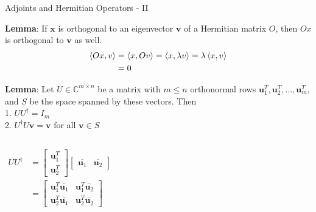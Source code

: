 \documentclass{beamer}
\begin{document}
\begin{frame}{Adjoints and Hermitian Operators - II\tiny{\cite{thespectraltheoremforhermitianmatrice}}}
  {\tiny
    \textbf{Lemma}: If $\mathbf{x}$ is orthogonal to an eigenvector $\mathbf{v}$ of a Hermitian matrix $O$, then $Ox$ is orthogonal to $\mathbf{v}$ as well. \\
    \begin{align*}
      \braket{Ox, v} &= \braket{x, Ov} = \braket{x, \lambda v} = \lambda \braket{x, v} \\
                     & = 0
    \end{align*}

    \vspace{0.3cm}
    \textbf{Lemma}: Let $U \in \mathbb{C}^{m \times n}$ be a matrix
    with $m \leq n$ orthonormal rows $\mathbf{u}_1^{T}, \mathbf{u}_2^{T}, \dots, \mathbf{u}_m^{T}$,
    and $S$ be the space spanned by these vectors. Then \\
    1. $UU^{\dagger} = I_m$ \\
    2. $U^{\dagger}U\mathbf{v} = \mathbf{v}$ for all $\mathbf{v} \in S$
    \begin{columns}
    \begin{align*}
      UU^{\dagger}
      &=
      \begin{bmatrix}
        \mathbf{u}_1^T \\
        \mathbf{u}_2^T
      \end{bmatrix}
      \begin{bmatrix}
        \overline{\mathbf{u}_1} & \overline{\mathbf{u}_2}
      \end{bmatrix} \\
      &= 
      \begin{bmatrix}
        \mathbf{u}_1^T \overline{\mathbf{u}_1} & \mathbf{u}_1^T \overline{\mathbf{u}_2} \\
        \mathbf{u}_2^T \overline{\mathbf{u}_1} & \mathbf{u}_2^T \overline{\mathbf{u}_2}
      \end{bmatrix}
    \end{align*}


\end{columns}}
\end{frame}
\end{document}
